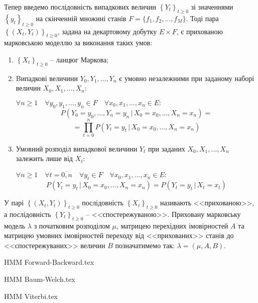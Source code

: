 \documentclass[a4paper,14pt]{extarticle} %
\begin{document}
Тепер введемо послідовність випадкових величин $\left\{ Y_t \right\}_{t\geqslant 0}$ зі значеннями $\left\{ y_t \right\}_{t\geqslant 0}$ на скінченній множині станів $F=\{f_1,f_2,\ldots,f_M\}$. Тоді пара $\left\{(X_t,Y_t)\right\}_{t\geqslant 0}$, задана на декартовому добутку $E\times F$, є прихованою марковською моделлю за виконання таких умов:
\begin{enumerate} [(1)]
    \item $\left\{ X_t \right\}_{t\geqslant 0}$ -- ланцюг Маркова;
    \item Bипадкові величини $Y_0,Y_1,\ldots,Y_n$ є умовно незалежними при заданому наборі величин $X_0,X_1,\ldots,X_n:$
    
    $\forall n\geqslant 1 \quad \forall y_0,y_1,\ldots,y_n \in F \quad \forall x_0,x_1,\ldots,x_n \in E:$
    \[ P(Y_0=y_0,\ldots,Y_n=y_n \, |\, X_0=x_0,\ldots,X_n=x_n)= \]
    \[ =\prod\limits_{t=0}^{n}P(Y_t=y_t \, |\, X_0=x_0,\ldots,X_n=x_n) \]
    \item Умовний розподіл випадкової величини $Y_t$ при заданих $X_0,X_1,\ldots,X_n$ залежить лише від  $X_t:$
    
    $\forall n\geqslant 1 \quad \forall t=\overline{0,n} \quad \forall y_t \in F \quad \forall x_0,x_1,\ldots,x_n \in E:$
	\[ P(Y_t=y_t \, |\, X_0=x_0,\ldots,X_n=x_n)=P(Y_t=y_t \, |\, X_t=x_t) \]
\end{enumerate}

У парі $\left\{(X_t,Y_t)\right\}_{t\geqslant 0}$ послідовність $\left\{ X_t \right\}_{t\geqslant 0}$ називають <<прихованою>>, а послідовність $\left\{ Y_t \right\}_{t\geqslant 0}$ -- <<спостережуваною>>. Приховану марковську модель $\lambda$ з початковим розподілом $\mu$, матрицею перехід\-них імовірностей $A$ та матрицею умовних імовірностей переходу від <<прихованих>> станів до <<спостережуваних>> величин $B$ позначатимемо так: $\lambda=(\mu,A,B)$.

{HMM Forward-Backward.tex}

{HMM Baum-Welch.tex}

{HMM Viterbi.tex}
\end{document}
